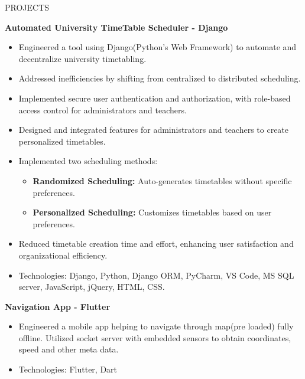 \documentclass{resume} %
\begin{document}
\begin{rSection}{PROJECTS}
\item \textbf{Automated University TimeTable Scheduler - Django}

\iffalse


 {Built a tool to easify the hectic and stressfull process of organization timetabling. Problem needed to solve was to make the process distributed instead of the current centralised timetable scheduling process. Keeping provided features for admin and teachers to solve the problem and create personalized timetables. Implemented two ways to get the final scheduled timetable, i.e. Randomised and personalized timetables}
 
\fi
 
 \begin{itemize}
 	\item Engineered a tool using Django(Python's Web Framework) to automate and decentralize university timetabling.
 	\item Addressed inefficiencies by shifting from centralized to distributed scheduling.
 	\item Implemented secure user authentication and authorization, with role-based access control for administrators and teachers.
 	\item Designed and integrated features for administrators and teachers to create personalized timetables.
 	\item Implemented two scheduling methods:
 	\begin{itemize}
 		\item \textbf{Randomized Scheduling:} Auto-generates timetables without specific preferences.
 		\item \textbf{Personalized Scheduling:} Customizes timetables based on user preferences.
 	\end{itemize}
 	\item Reduced timetable creation time and effort, enhancing user satisfaction and organizational efficiency.
 	\item Technologies: Django, Python, Django ORM, PyCharm, VS Code, MS SQL server, JavaScript, jQuery, HTML, CSS.
 \end{itemize}
 
 
\item \textbf{Navigation App - Flutter} 
 \begin{itemize}
\item {Engineered a mobile app helping to navigate through map(pre loaded) fully offline. Utilized socket server with embedded sensors to obtain coordinates, speed and other meta data.}
\item {Technologies: Flutter, Dart}
 \end{itemize}

\end{rSection} 
\end{document}
